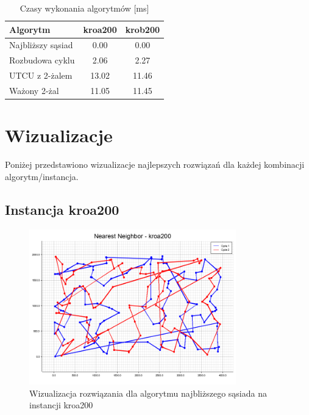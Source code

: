 \documentclass[12pt,a4paper]{article}
\begin{document}
\begin{table}[H]
\centering
\caption{Czasy wykonania algorytmów [ms]}
\begin{tabular}{lcc}
\toprule
\textbf{Algorytm} & \textbf{kroa200} & \textbf{krob200} \\
\midrule
Najbliższy sąsiad & 0.00 & 0.00 \\
Rozbudowa cyklu & 2.06 & 2.27 \\
UTCU z 2-żalem & 13.02 & 11.46 \\
Ważony 2-żal & 11.05 & 11.45 \\
\bottomrule
\end{tabular}
\end{table}

\section{Wizualizacje}
Poniżej przedstawiono wizualizacje najlepszych rozwiązań dla każdej kombinacji algorytm/instancja.

\subsection{Instancja kroa200}

\begin{figure}[H]
\centering
\includegraphics[width=0.8\textwidth]{figures/kroa200_Nearest_Neighbor.png}
\caption{Wizualizacja rozwiązania dla algorytmu najbliższego sąsiada na instancji kroa200}
\end{figure}
\end{document}
